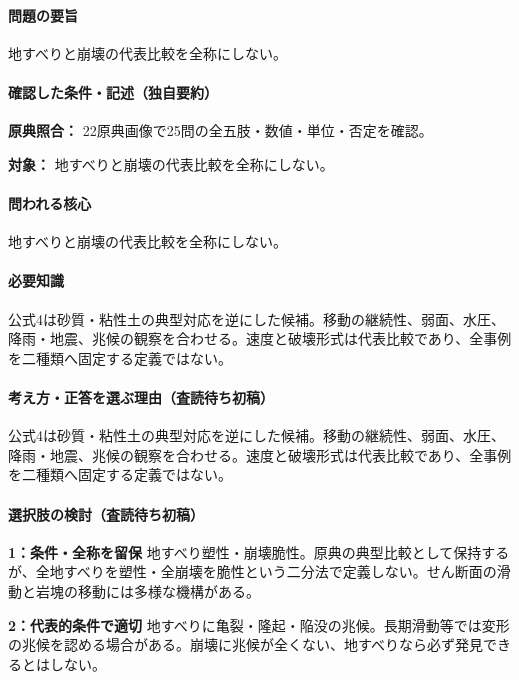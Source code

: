 \paragraph{問題の要旨} 地すべりと崩壊の代表比較を全称にしない。

\paragraph{確認した条件・記述（独自要約）}\mbox{}\par

\noindent\textbf{原典照合：} 22原典画像で25問の全五肢・数値・単位・否定を確認。\par

\noindent\textbf{対象：} 地すべりと崩壊の代表比較を全称にしない。\par

\paragraph{問われる核心} 地すべりと崩壊の代表比較を全称にしない。

\paragraph{必要知識} 公式4は砂質・粘性土の典型対応を逆にした候補。移動の継続性、弱面、水圧、降雨・地震、兆候の観察を合わせる。速度と破壊形式は代表比較であり、全事例を二種類へ固定する定義ではない。

\paragraph{考え方・正答を選ぶ理由（査読待ち初稿）} 公式4は砂質・粘性土の典型対応を逆にした候補。移動の継続性、弱面、水圧、降雨・地震、兆候の観察を合わせる。速度と破壊形式は代表比較であり、全事例を二種類へ固定する定義ではない。

\paragraph{選択肢の検討（査読待ち初稿）}\mbox{}\par

\noindent\textbf{1：条件・全称を留保} 地すべり塑性・崩壊脆性。原典の典型比較として保持するが、全地すべりを塑性・全崩壊を脆性という二分法で定義しない。せん断面の滑動と岩塊の移動には多様な機構がある。\par

\noindent\textbf{2：代表的条件で適切} 地すべりに亀裂・隆起・陥没の兆候。長期滑動等では変形の兆候を認める場合がある。崩壊に兆候が全くない、地すべりなら必ず発見できるとはしない。\par

